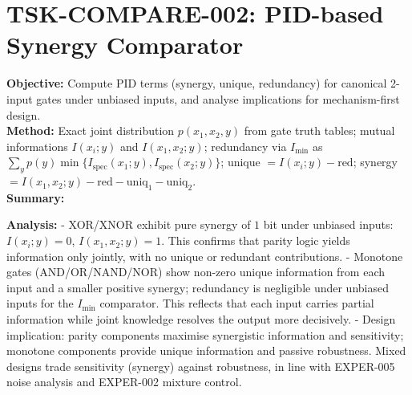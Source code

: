 \documentclass[11pt]{article}
\begin{document}
\section{TSK-COMPARE-002: PID-based Synergy Comparator}
\textbf{Objective:} Compute PID terms (synergy, unique, redundancy) for canonical 2-input gates under unbiased inputs, and analyse implications for mechanism-first design.\\
\textbf{Method:} Exact joint distribution $p(x_1,x_2,y)$ from gate truth tables; mutual informations $I(x_i;y)$ and $I(x_1,x_2;y)$; redundancy via $I_{\min}$ as $\sum_y p(y)\min\{I_{\mathrm{spec}}(x_1;y),I_{\mathrm{spec}}(x_2;y)\}$; unique $= I(x_i;y)-\mathrm{red}$; synergy $= I(x_1,x_2;y)-\mathrm{red}-\mathrm{uniq}_1-\mathrm{uniq}_2$.\\
\textbf{Summary:}\\
\begin{center}
\end{center}
\textbf{Analysis:}
- XOR/XNOR exhibit pure synergy of $1$ bit under unbiased inputs: $I(x_i;y)=0$, $I(x_1,x_2;y)=1$. This confirms that parity logic yields information only jointly, with no unique or redundant contributions.
- Monotone gates (AND/OR/NAND/NOR) show non-zero unique information from each input and a smaller positive synergy; redundancy is negligible under unbiased inputs for the $I_{\min}$ comparator. This reflects that each input carries partial information while joint knowledge resolves the output more decisively.
- Design implication: parity components maximise synergistic information and sensitivity; monotone components provide unique information and passive robustness. Mixed designs trade sensitivity (synergy) against robustness, in line with EXPER-005 noise analysis and EXPER-002 mixture control.
\end{document}
